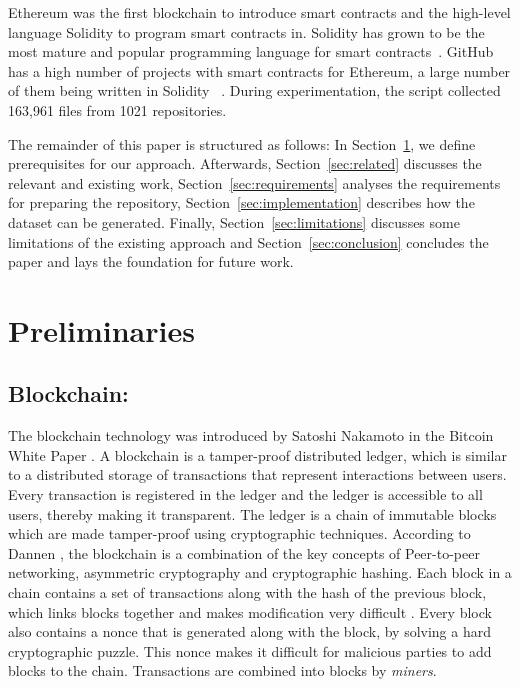 \documentclass[10pt,conference]{IEEEtran}
\begin{document}
	Ethereum was the first blockchain to introduce smart contracts and the high-level language Solidity to program smart contracts in. Solidity has grown to be the most mature and popular programming language for smart contracts~\cite{soliditycheck}. GitHub has a high number of projects with smart contracts for Ethereum, a large number of them being written in Solidity ~\cite{empiricalgithubcontracts}. During experimentation, the script collected 163,961 files from 1021 repositories.
	
	The remainder of this paper is structured as follows: In Section~\ref{sec:prelims}, we define  prerequisites for our approach. 	Afterwards, Section~\ref{sec:related} discusses the relevant and existing work,
	 Section~\ref{sec:requirements} analyses the requirements for preparing the repository, Section~\ref{sec:implementation} describes how the dataset can be generated. Finally, Section~\ref{sec:limitations} discusses some limitations of the existing approach and Section~\ref{sec:conclusion} concludes the paper and lays the foundation for future work.
	
	
	\section{Preliminaries}
	\label{sec:prelims}
	
	\subsection{Blockchain:}
	The blockchain technology was introduced by Satoshi Nakamoto in the Bitcoin White Paper \cite{bitcoinpaper}. A blockchain is a tamper-proof distributed ledger, which is similar to a distributed storage of transactions \cite{bitcoinbook} that represent interactions between users. Every transaction is registered in the ledger and the ledger is accessible to all users, thereby making it transparent. The ledger is a chain of immutable blocks which are made tamper-proof using cryptographic techniques. According to Dannen \cite{bitcoinbook}, the blockchain is a combination of the key concepts of Peer-to-peer networking, asymmetric cryptography and cryptographic hashing. Each block in a chain contains a set of transactions along with the hash of the previous block, which links blocks together and makes modification very difficult \cite{bitcoinpaper}. Every block also contains a nonce that is generated along with the block, by solving a hard cryptographic puzzle. This nonce makes it difficult for malicious parties to add blocks to the chain. Transactions are combined into blocks by \textit{miners}.
	
\end{document}
